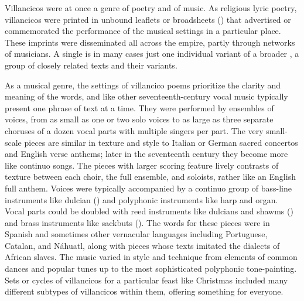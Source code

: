 
Villancicos were at once a genre of poetry and of music.
As religious lyric poetry, villancicos were printed in unbound leaflets or
broadsheets () that advertised or commemorated the
performance of the musical settings in a particular place.%
    \Autocite{LopezLorenzo:VC-Sevillano}
These imprints were disseminated all across the empire, partly through networks
of musicians.
A single  is in many cases just one individual variant of
a broader , a group of closely related texts and their
variants.


As a musical genre, the settings of villancico poems prioritize the clarity and
meaning of the words, and like other seventeenth-century vocal music typically
present one phrase of text at a time.
They were performed by ensembles of voices, from as small as one or two solo
voices to as large as three separate choruses of a dozen vocal parts with
multiple singers per part.
The very small-scale pieces are similar in texture and style to Italian or
German sacred concertos and English verse anthems; later in the seventeenth
century they become more like continuo songs.%
    \Autocite{Kendrick:SacredSongs}
The pieces with larger scoring feature lively contrasts of texture between each
choir, the full ensemble, and soloists, rather like an English full anthem.
Voices were typically accompanied by a continuo group of bass-line instruments
like dulcian () and polyphonic instruments like harp and organ.
Vocal parts could be doubled with reed instruments like dulcians and shawms
() and brass instruments like sackbuts ().
The words for these pieces were in Spanish and sometimes other vernacular
languages including Portuguese, Catalan, and Náhuatl, along with pieces whose
texts imitated the dialects of African slaves.
The music varied in style and technique from elements of common dances
and popular tunes up to the most sophisticated polyphonic tone-painting.
Sets or cycles of villancicos for a particular feast like Christmas included
many different subtypes of villancicos within them, offering something for
everyone.

